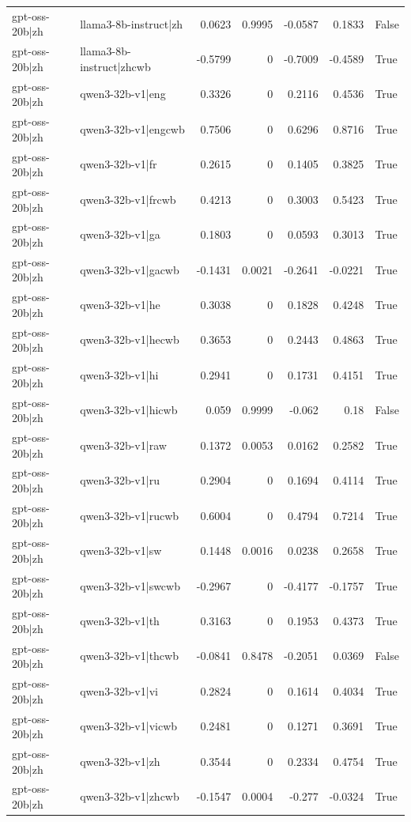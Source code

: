 \begin{table}
\begin{tabular}{l l r r r r l}
gpt-oss-20b|zh & llama3-8b-instruct|zh & 0.0623 & 0.9995 & -0.0587 & 0.1833 & False \\
gpt-oss-20b|zh & llama3-8b-instruct|zhcwb & -0.5799 & 0 & -0.7009 & -0.4589 & True \\
gpt-oss-20b|zh & qwen3-32b-v1|eng & 0.3326 & 0 & 0.2116 & 0.4536 & True \\
gpt-oss-20b|zh & qwen3-32b-v1|engcwb & 0.7506 & 0 & 0.6296 & 0.8716 & True \\
gpt-oss-20b|zh & qwen3-32b-v1|fr & 0.2615 & 0 & 0.1405 & 0.3825 & True \\
gpt-oss-20b|zh & qwen3-32b-v1|frcwb & 0.4213 & 0 & 0.3003 & 0.5423 & True \\
gpt-oss-20b|zh & qwen3-32b-v1|ga & 0.1803 & 0 & 0.0593 & 0.3013 & True \\
gpt-oss-20b|zh & qwen3-32b-v1|gacwb & -0.1431 & 0.0021 & -0.2641 & -0.0221 & True \\
gpt-oss-20b|zh & qwen3-32b-v1|he & 0.3038 & 0 & 0.1828 & 0.4248 & True \\
gpt-oss-20b|zh & qwen3-32b-v1|hecwb & 0.3653 & 0 & 0.2443 & 0.4863 & True \\
gpt-oss-20b|zh & qwen3-32b-v1|hi & 0.2941 & 0 & 0.1731 & 0.4151 & True \\
gpt-oss-20b|zh & qwen3-32b-v1|hicwb & 0.059 & 0.9999 & -0.062 & 0.18 & False \\
gpt-oss-20b|zh & qwen3-32b-v1|raw & 0.1372 & 0.0053 & 0.0162 & 0.2582 & True \\
gpt-oss-20b|zh & qwen3-32b-v1|ru & 0.2904 & 0 & 0.1694 & 0.4114 & True \\
gpt-oss-20b|zh & qwen3-32b-v1|rucwb & 0.6004 & 0 & 0.4794 & 0.7214 & True \\
gpt-oss-20b|zh & qwen3-32b-v1|sw & 0.1448 & 0.0016 & 0.0238 & 0.2658 & True \\
gpt-oss-20b|zh & qwen3-32b-v1|swcwb & -0.2967 & 0 & -0.4177 & -0.1757 & True \\
gpt-oss-20b|zh & qwen3-32b-v1|th & 0.3163 & 0 & 0.1953 & 0.4373 & True \\
gpt-oss-20b|zh & qwen3-32b-v1|thcwb & -0.0841 & 0.8478 & -0.2051 & 0.0369 & False \\
gpt-oss-20b|zh & qwen3-32b-v1|vi & 0.2824 & 0 & 0.1614 & 0.4034 & True \\
gpt-oss-20b|zh & qwen3-32b-v1|vicwb & 0.2481 & 0 & 0.1271 & 0.3691 & True \\
gpt-oss-20b|zh & qwen3-32b-v1|zh & 0.3544 & 0 & 0.2334 & 0.4754 & True \\
gpt-oss-20b|zh & qwen3-32b-v1|zhcwb & -0.1547 & 0.0004 & -0.277 & -0.0324 & True \\

\end{tabular}
\end{table}
